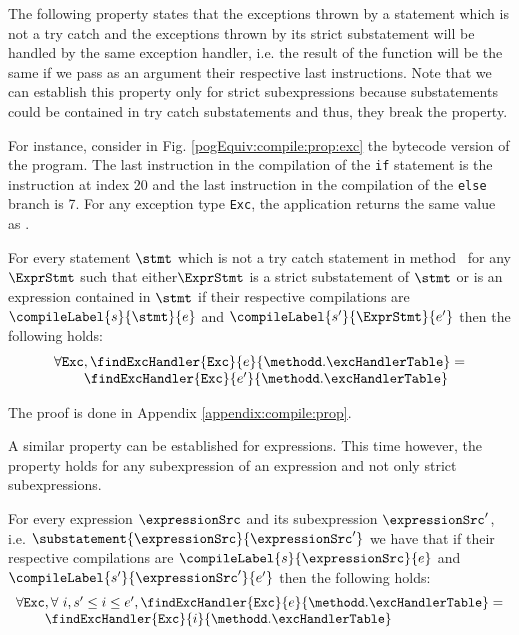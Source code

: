 The following property states that the exceptions thrown by a 
statement which is not a try catch and the  exceptions thrown by its strict substatement
will be handled by the same exception handler, i.e. the result of the function \findExcHandler{}{}{} will be the same 
if we pass as an argument their respective last instructions. Note that we can establish this property only
for strict subexpressions because  substatements could be contained in try catch substatements and
 thus, they   break the property.

 For instance, consider in Fig. \ref{pogEquiv:compile:prop:exc} 
the bytecode version of the program. The last  instruction in the compilation of the \lstinline!if! statement is the 
instruction at index 20 and the last instruction in the compilation of the \lstinline!else! branch is 7. 
For any exception type \mbox{\rm\tt{Exc}}, the application  returns the same value  as
. 

\begin{compProp8}\label{compile:prop:compProp8}
  For every statement $\stmt$ which is not a try catch statement  in method \methodd \ for  any $\ExprStmt$ such that
  either$\ExprStmt$ is a  strict substatement of $\stmt$ 
  or is  an expression contained in  $\stmt$
if their respective compilations are  $\compileLabel{s}{\stmt}{e}$ and  $\compileLabel{s'}{\ExprStmt}{e'}$ then the following holds:
$$ \begin{array}{l}
          \forall \mbox{\rm\tt{Exc}}, \findExcHandler{\mbox{\rm\tt{Exc}} }{e}{\methodd.\excHandlerTable} = \\
	  \phantom{\forall \mbox{\rm\tt{Exc}} }\findExcHandler{\mbox{\rm\tt{Exc}} }{e'}{\methodd.\excHandlerTable} 
   \end{array}
$$

\end{compProp8}
The proof is done in Appendix \ref{appendix:compile:prop}.

A similar property can be established for expressions. This time however, the property holds for any subexpression of an expression and not only 
strict subexpressions. 
 
\begin{compProp9}\label{compile:prop:compProp9}
  For every expression $\expressionSrc$ and its subexpression
 $\expressionSrc'$, i.e. $\substatement{\expressionSrc}{\expressionSrc'}$
 we have that 
if their respective compilations are  $\compileLabel{s}{\expressionSrc}{e}$ and  $\compileLabel{s'}{\expressionSrc'}{e'}$
 then the following holds:
$$ \begin{array}{l}
          \forall \mbox{\rm\tt{Exc}}, \forall  \ i, s' \le i \le e' ,  \findExcHandler{\mbox{\rm\tt{Exc}} }{e}{\methodd.\excHandlerTable} = \\
	  \phantom{\forall \mbox{\rm\tt{Exc}} }\findExcHandler{\mbox{\rm\tt{Exc}} }{i}{\methodd.\excHandlerTable} 
   \end{array}
$$
\end{compProp9}

